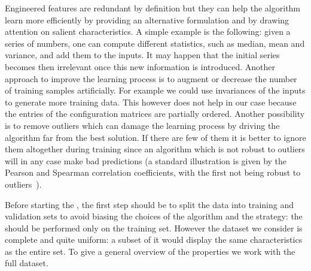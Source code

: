 Engineered features are redundant by definition but they can help the algorithm learn more efficiently by providing an alternative formulation and by drawing attention on salient characteristics.
A simple example is the following: given a series of numbers, one can compute different statistics, such as median, mean and variance, and add them to the inputs.
It may happen that the initial series becomes then irrelevant once this new information is introduced.
Another approach to improve the learning process is to augment or decrease the number of training samples artificially.\footnotemark{}
For example we could use invariances of the inputs to generate more training data.
This however does not help in our case because the entries of the configuration matrices are partially ordered.
Another possibility is to remove outliers which can damage the learning process by driving the algorithm far from the best solution.
If there are few of them it is better to ignore them altogether during training since an algorithm which is not robust to outliers will in any case make bad predictions (a standard illustration is given by the Pearson and Spearman correlation coefficients, with the first not being robust to outliers~\cite{Skiena:2017:DataScienceDesign}).

Before starting the \eda, the first step should be to split the data into training and validation sets to avoid biasing the choices of the algorithm and the strategy: the \eda should be performed only on the training set.
However the dataset we consider is complete and quite uniform: a subset of it would display the same characteristics as the entire set.\footnotemark{}
To give a general overview of the properties we work with the full dataset.


